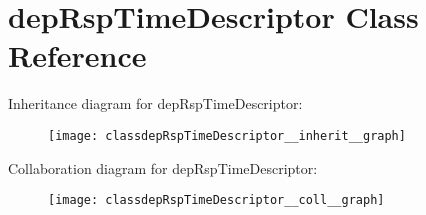 \hypertarget{classdepRspTimeDescriptor}{}\section{dep\+Rsp\+Time\+Descriptor Class Reference}
\label{classdepRspTimeDescriptor}


Inheritance diagram for dep\+Rsp\+Time\+Descriptor\+:\nopagebreak
\begin{figure}[H]
\begin{center}
\leavevmode
\texttt{[image: classdepRspTimeDescriptor\_\_inherit\_\_graph]}
\end{center}
\end{figure}


Collaboration diagram for dep\+Rsp\+Time\+Descriptor\+:\nopagebreak
\begin{figure}[H]
\begin{center}
\leavevmode
\texttt{[image: classdepRspTimeDescriptor\_\_coll\_\_graph]}
\end{center}
\end{figure}
